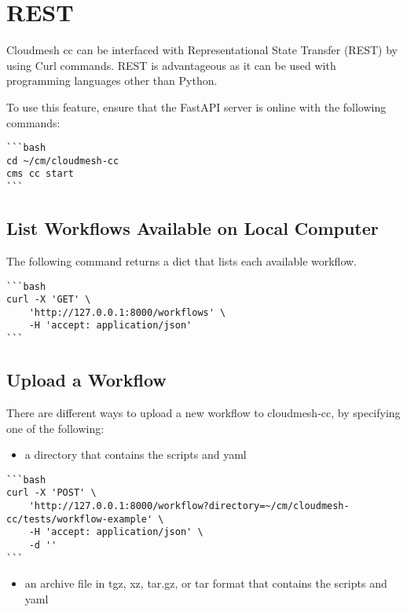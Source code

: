 \section{REST}\label{rest}

Cloudmesh cc can be interfaced with Representational State Transfer
(REST) by using Curl commands. REST is advantageous as it can be used
with programming languages other than Python.

To use this feature, ensure that the FastAPI server is online with the
following commands:

\begin{verbatim}
```bash
cd ~/cm/cloudmesh-cc
cms cc start
```
\end{verbatim}

\subsection{List Workflows Available on Local
Computer}\label{list-workflows-available-on-local-computer}

The following command returns a dict that lists each available workflow.

\begin{verbatim}
```bash
curl -X 'GET' \
    'http://127.0.0.1:8000/workflows' \
    -H 'accept: application/json'
```
\end{verbatim}

\subsection{Upload a Workflow}\label{upload-a-workflow}

There are different ways to upload a new workflow to cloudmesh-cc, by
specifying one of the following:

\begin{itemize}
\tightlist
\item
  a directory that contains the scripts and yaml
\end{itemize}

\begin{verbatim}
```bash
curl -X 'POST' \
    'http://127.0.0.1:8000/workflow?directory=~/cm/cloudmesh-cc/tests/workflow-example' \
    -H 'accept: application/json' \
    -d ''
```
\end{verbatim}

\begin{itemize}
\tightlist
\item
  an archive file in tgz, xz, tar.gz, or tar format that contains the
  scripts and yaml
\end{itemize}

